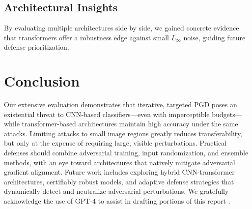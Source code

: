 \documentclass[twoside,11pt]{article}
\begin{document}
\subsection{Architectural Insights}
By evaluating multiple architectures side by side, we gained concrete evidence that transformers offer a robustness edge against small $L_\infty$ noise, guiding future defense prioritization.

\section{Conclusion}

Our extensive evaluation demonstrates that iterative, targeted PGD poses an existential threat to CNN‐based classifiers—even with imperceptible budgets—while transformer‐based architectures maintain high accuracy under the same attacks. Limiting attacks to small image regions greatly reduces transferability, but only at the expense of requiring large, visible perturbations. Practical defenses should combine adversarial training, input randomization, and ensemble methods, with an eye toward architectures that natively mitigate adversarial gradient alignment. Future work includes exploring hybrid CNN‐transformer architectures, certifiably robust models, and adaptive defense strategies that dynamically detect and neutralize adversarial perturbations. We gratefully acknowledge the use of GPT‑4 to assist in drafting portions of this report \citep{openai2023gpt4}.


\small


\end{document}
